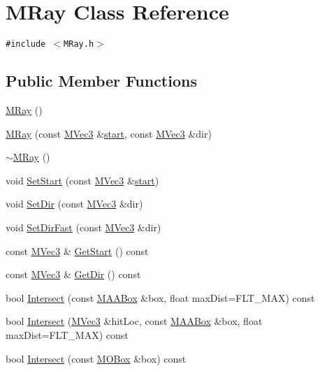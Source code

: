 \hypertarget{class_m_ray}{
\section{MRay Class Reference}
\label{class_m_ray}
}
{\tt \#include $<$MRay.h$>$}

\subsection*{Public Member Functions}
\begin{CompactItemize}
\item 
\hyperlink{class_m_ray_5babd699f32d3d26c009a23fb7a16079}{MRay} ()
\item 
\hyperlink{class_m_ray_c9fb26538c0007be7fc62fda53519653}{MRay} (const \hyperlink{class_m_vec3}{MVec3} \&\hyperlink{glext__bak_8h_c55adc720a3098c1b454d2a4647f4361}{start}, const \hyperlink{class_m_vec3}{MVec3} \&dir)
\item 
\hyperlink{class_m_ray_23fc1bdfd8238df1124a73f541dd4563}{$\sim$MRay} ()
\item 
void \hyperlink{class_m_ray_116cc00ec9c732cf178a57a8110b3efe}{SetStart} (const \hyperlink{class_m_vec3}{MVec3} \&\hyperlink{glext__bak_8h_c55adc720a3098c1b454d2a4647f4361}{start})
\item 
void \hyperlink{class_m_ray_8239de44f8ebfe53f5d702aafb2e4804}{SetDir} (const \hyperlink{class_m_vec3}{MVec3} \&dir)
\item 
void \hyperlink{class_m_ray_5736afa27c05767f237c46842dece57f}{SetDirFast} (const \hyperlink{class_m_vec3}{MVec3} \&dir)
\item 
const \hyperlink{class_m_vec3}{MVec3} \& \hyperlink{class_m_ray_50cd4ec247b5df4a4a336478a3a19c91}{GetStart} () const 
\item 
const \hyperlink{class_m_vec3}{MVec3} \& \hyperlink{class_m_ray_cd7ab740f3c8ff43dd79f95ed9a969b6}{GetDir} () const 
\item 
bool \hyperlink{class_m_ray_d58f4fca993f73968696e69fa58f4a93}{Intersect} (const \hyperlink{class_m_a_a_box}{MAABox} \&box, float maxDist=FLT\_\-MAX) const 
\item 
bool \hyperlink{class_m_ray_fb0bbae116de05c8e324382792caa4c0}{Intersect} (\hyperlink{class_m_vec3}{MVec3} \&hitLoc, const \hyperlink{class_m_a_a_box}{MAABox} \&box, float maxDist=FLT\_\-MAX) const 
\item 
bool \hyperlink{class_m_ray_a1ba271e3402f579aa42db8bf9ff42f0}{Intersect} (const \hyperlink{class_m_o_box}{MOBox} \&box) const 
\item 

\end{CompactItemize}
